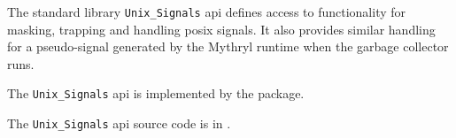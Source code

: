 
The standard library {\tt Unix\_Signals} api defines access to functionality for 
masking, trapping and handling posix signals.  It also provides similar handling 
for a pseudo-signal generated by the Mythryl runtime when the garbage collector 
runs.

The {\tt Unix\_Signals} api is implemented by the  package.

The {\tt Unix\_Signals} api source code is in .

